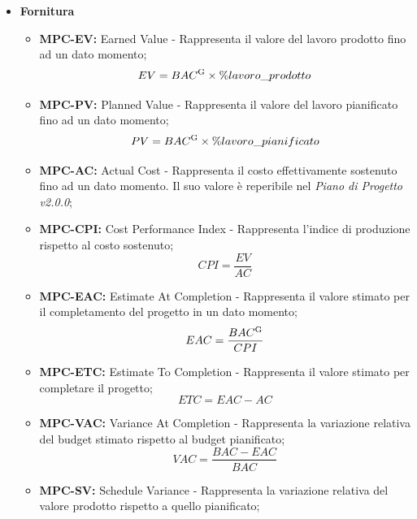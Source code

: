 \documentclass[8pt]{article}
\newcommand{\glossterm}[1]{#1\textsuperscript{G}} %
\begin{document}
\begin{itemize}
   \item \textbf{Fornitura}
        \begin{itemize}
            \item \textbf{MPC-EV:} Earned Value - Rappresenta il valore del lavoro prodotto fino ad un dato momento;
                \begin{equation}
                EV = \glossterm{BAC} \times \%lavoro\_prodotto
                \end{equation}
            \item \textbf{MPC-PV:} Planned Value - Rappresenta il valore del lavoro pianificato fino ad un dato momento;
                \begin{equation}
                PV = \glossterm{BAC} \times \%lavoro\_pianificato
                \end{equation}
            \item \textbf{MPC-AC:} Actual Cost - Rappresenta il costo effettivamente sostenuto fino ad un dato momento. Il suo valore è reperibile nel \textit{Piano di Progetto v2.0.0};
            \item \textbf{MPC-CPI:} Cost Performance Index - Rappresenta l'indice di produzione rispetto al costo sostenuto;
                \begin{equation}
                CPI = \frac{EV}{AC}
                \end{equation}
            \item \textbf{MPC-EAC:} Estimate At Completion - Rappresenta il valore stimato per il completamento del progetto in un dato momento;
                \begin{equation}
                EAC = \frac{\glossterm{BAC}}{CPI}
                \end{equation}
            \item \textbf{MPC-ETC:} Estimate To Completion - Rappresenta il valore stimato per completare il progetto;
                \begin{equation}
                ETC = EAC - AC
                \end{equation}
            \item \textbf{MPC-VAC:} Variance At Completion - Rappresenta la variazione relativa del budget stimato rispetto al budget pianificato;
                \begin{equation}
                VAC = \frac{BAC - EAC}{BAC}
                \end{equation}
            \item \textbf{MPC-SV:} Schedule Variance - Rappresenta la variazione relativa del valore prodotto rispetto a quello pianificato;

\end{itemize}
\end{itemize}
\end{document}
